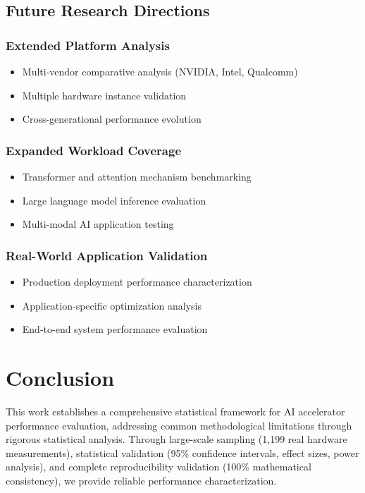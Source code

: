 \documentclass[manuscript]{acmart}
\begin{document}
\subsection{Future Research Directions}

\subsubsection{Extended Platform Analysis}
\begin{itemize}
    \item Multi-vendor comparative analysis (NVIDIA, Intel, Qualcomm)
    \item Multiple hardware instance validation
    \item Cross-generational performance evolution
\end{itemize}

\subsubsection{Expanded Workload Coverage}
\begin{itemize}
    \item Transformer and attention mechanism benchmarking
    \item Large language model inference evaluation
    \item Multi-modal AI application testing
\end{itemize}

\subsubsection{Real-World Application Validation}
\begin{itemize}
    \item Production deployment performance characterization
    \item Application-specific optimization analysis
    \item End-to-end system performance evaluation
\end{itemize}

\section{Conclusion}

This work establishes a comprehensive statistical framework for AI accelerator performance evaluation, addressing common methodological limitations through rigorous statistical analysis. Through large-scale sampling (1,199 real hardware measurements), statistical validation (95\% confidence intervals, effect sizes, power analysis), and complete reproducibility validation (100\% mathematical consistency), we provide reliable performance characterization.
\end{document}
